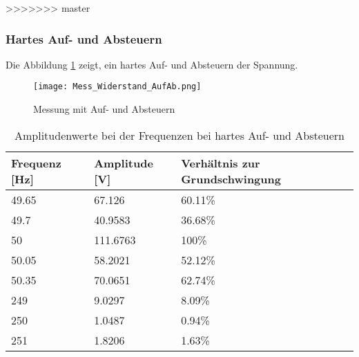 >>>>>>> master


\newpage
\subsubsection*{Hartes Auf- und Absteuern}
Die Abbildung \ref{fig:Mess_Sanft} zeigt, ein hartes Auf- und Absteuern der Spannung.

\begin{figure}[ht!]
	\centering
	\texttt{[image: Mess\_Widerstand\_AufAb.png]}	
	\caption{Messung mit Auf- und Absteuern}\label{fig:Mess_Sanft}
\end{figure}


\begin{table}[ht!]
	\centering
	\begin{tabular}{|l|l|l|}
		\hline
		Frequenz {[}Hz{]} & Amplitude {[}V{]} & Verhältnis zur Grundschwingung \\ \hline
		49.65             & 67.126            & 60.11\%                        \\ \hline
		49.7              & 40.9583           & 36.68\%                        \\ \hline
		50                & 111.6763          & 100\%                          \\ \hline
		50.05             & 58.2021           & 52.12\%                        \\ \hline
		50.35             & 70.0651           & 62.74\%                        \\ \hline
		249               & 9.0297            & 8.09\%                         \\ \hline
		250               & 1.0487            & 0.94\%                         \\ \hline
		251 		      & 1.8206            & 1.63\%                         \\ \hline
	\end{tabular}
\caption{Amplitudenwerte bei der Frequenzen bei hartes Auf- und Absteuern}\label{tab:Mess_Spannung_AufAb_hart}
\end{table}

